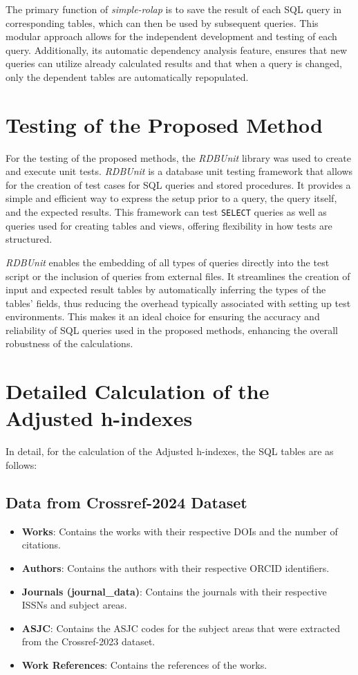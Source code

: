 The primary function of \emph{simple-rolap} is to save the result of each SQL
query in corresponding tables, which can then be used by subsequent queries.
This modular approach allows for the independent development and testing of
each query. Additionally, its automatic dependency analysis feature, ensures
that new queries can utilize already calculated results and that when a query
is changed, only the dependent tables are automatically repopulated.

\section{Testing of the Proposed Method}
For the testing of the proposed methods, the \emph{RDBUnit} \cite{rdbunit}
library was used to create and execute unit tests. \emph{RDBUnit} is a database
unit testing framework that allows for the creation of test cases for SQL
queries and stored procedures. It provides a simple and efficient way
to express the setup prior to a query, the query itself, and the expected
results. This framework can test \texttt{SELECT} queries as well as queries
used for creating tables and views, offering flexibility in how tests are
structured.

\emph{RDBUnit} enables the embedding of all types of queries directly into the test
script or the inclusion of queries from external files. It streamlines the
creation of input and expected result tables by automatically inferring the
types of the tables' fields, thus reducing the overhead typically associated
with setting up test environments. This makes it an ideal choice for
ensuring the accuracy and reliability of SQL queries used in the proposed
methods, enhancing the overall robustness of the calculations.

\section{Detailed Calculation of the Adjusted h-indexes}

In detail, for the calculation of the Adjusted h-indexes, the SQL tables are as
follows:

\subsection{Data from Crossref-2024 Dataset}
\begin{itemize}
      \item \textbf{Works}: Contains the works with their respective DOIs and the number of citations.
      \item \textbf{Authors}: Contains the authors with their respective ORCID identifiers.
      \item \textbf{Journals (journal\_data)}: Contains the journals with their respective ISSNs and subject areas.
      \item \textbf{ASJC}: Contains the ASJC codes for the subject areas that were extracted from the Crossref-2023 dataset.
      \item \textbf{Work References}: Contains the references of the works.
\end{itemize}

